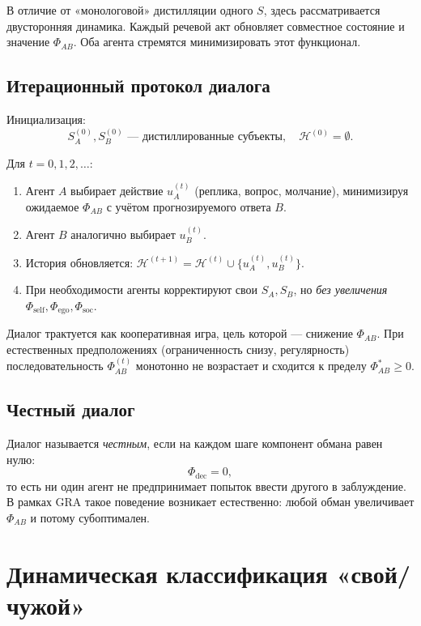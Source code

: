 \documentclass[11pt,a4paper]{article}
\begin{document}
В отличие от «монологовой» дистилляции одного \(S\), здесь рассматривается
двусторонняя динамика. Каждый речевой акт обновляет совместное состояние
и значение \(\Phi_{AB}\). Оба агента стремятся минимизировать этот функционал.

\subsection{Итерационный протокол диалога}

Инициализация:
\[
  S_A^{(0)}, S_B^{(0)} \text{ — дистиллированные субъекты}, \quad
  \mathcal{H}^{(0)} = \emptyset.
\]

Для \(t = 0, 1, 2, \dots\):

\begin{enumerate}
  \item Агент \(A\) выбирает действие \(u_A^{(t)}\)
        (реплика, вопрос, молчание), минимизируя ожидаемое
        \(\Phi_{AB}\) с учётом прогнозируемого ответа \(B\).
  \item Агент \(B\) аналогично выбирает \(u_B^{(t)}\).
  \item История обновляется:
        \(\mathcal{H}^{(t+1)} = \mathcal{H}^{(t)} \cup \{u_A^{(t)}, u_B^{(t)}\}\).
  \item При необходимости агенты корректируют свои \(S_A, S_B\),
        но \emph{без увеличения} \(\Phi_{\text{self}}, \Phi_{\text{ego}},
        \Phi_{\text{soc}}\).
\end{enumerate}

Диалог трактуется как кооперативная игра, цель которой — снижение
\(\Phi_{AB}\). При естественных предположениях (ограниченность снизу,
регулярность) последовательность \(\Phi_{AB}^{(t)}\) монотонно не возрастает
и сходится к пределу \(\Phi_{AB}^\ast \ge 0\).

\subsection{Честный диалог}

Диалог называется \emph{честным}, если на каждом шаге компонент
обмана равен нулю:
\[
  \Phi_{\text{dec}} = 0,
\]
то есть ни один агент не предпринимает попыток ввести другого в
заблуждение. В рамках GRA такое поведение возникает естественно:
любой обман увеличивает \(\Phi_{AB}\) и потому субоптимален.

\section{Динамическая классификация «свой/чужой»}
\end{document}
